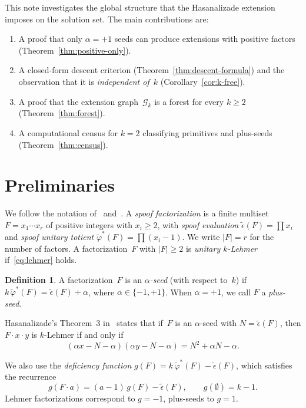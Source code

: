 \documentclass[11pt]{article}
\theoremstyle{definition}
\newtheorem{definition}[theorem]{Definition}
\theoremstyle{remark}
\newcommand{\eps}{\tilde{\epsilon}}
\newcommand{\phist}{\tilde{\varphi}^*}
\begin{document}
This note investigates the global structure that the Hasanalizade extension
imposes on the solution set.  The main contributions are:
\begin{enumerate}[label=(\roman*)]
  \item A proof that only $\alpha = +1$ seeds can produce extensions with
    positive factors (Theorem~\ref{thm:positive-only}).
  \item A closed-form descent criterion
    (Theorem~\ref{thm:descent-formula}) and the observation that it
    is \emph{independent of~$k$} (Corollary~\ref{cor:k-free}).
  \item A proof that the extension graph~$\mathcal{G}_k$ is a forest
    for every $k \ge 2$ (Theorem~\ref{thm:forest}).
  \item A computational census for $k = 2$ classifying
    primitives and plus-seeds (Theorem~\ref{thm:census}).
\end{enumerate}


\section{Preliminaries}

We follow the notation of~\cite{MS26} and~\cite{H26}.  A \emph{spoof
factorization} is a finite multiset $F = x_1 \cdots x_r$ of positive
integers with $x_i \ge 2$, with \emph{spoof evaluation}
$\eps(F) = \prod x_i$ and \emph{spoof unitary totient}
$\phist(F) = \prod(x_i - 1)$.  We write $|F| = r$ for the number of
factors.  A factorization~$F$ with $|F| \ge 2$ is \emph{unitary $k$-Lehmer}
if~\eqref{eq:lehmer} holds.

\begin{definition}\label{def:seed}
A factorization~$F$ is an \emph{$\alpha$-seed} (with respect to~$k$) if
$k\,\phist(F) = \eps(F) + \alpha$, where $\alpha \in \{-1, +1\}$.  When
$\alpha = +1$, we call $F$ a \emph{plus-seed}.
\end{definition}

Hasanalizade's Theorem~3 in~\cite{H26} states that if~$F$ is an
$\alpha$-seed with $N = \eps(F)$, then $F \cdot x \cdot y$ is $k$-Lehmer
if and only if
\begin{equation}\label{eq:hasanalizade}
  (\alpha x - N - \alpha)(\alpha y - N - \alpha) = N^2 + \alpha N - \alpha.
\end{equation}

We also use the \emph{deficiency function} $g(F) = k\,\phist(F) - \eps(F)$,
which satisfies the recurrence
\begin{equation}\label{eq:recurrence}
  g(F \cdot a) = (a-1)\,g(F) - \eps(F), \qquad g(\emptyset) = k - 1.
\end{equation}
Lehmer factorizations correspond to $g = -1$, plus-seeds to $g = 1$.
\end{document}
